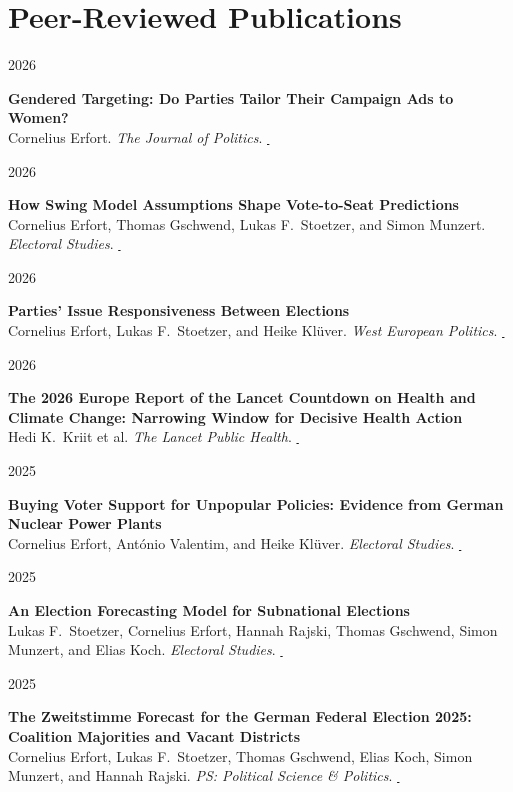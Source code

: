 \documentclass[11pt,a4paper]{article}
\newlength{\cvleftw}\setlength{\cvleftw}{0.20\textwidth}
\newlength{\cvrightw}\setlength{\cvrightw}{0.76\textwidth}
\newlength{\cvgap}\setlength{\cvgap}{0.02\textwidth}
\newenvironment{cventries}{\par\setlength{\parskip}{0pt}}{\par}
\newcommand{\cvitem}[2]{%
  \par\nopagebreak[2]%
  \noindent
  \begin{minipage}[t]{\cvleftw}\raggedright\color{cvmuted}\small\vspace{0pt}\strut #1\end{minipage}%
  \hspace{\cvgap}%
  \begin{minipage}[t]{\cvrightw}\raggedright\vspace{0pt}\strut #2\end{minipage}%
  \par\vspace{10pt plus 3pt minus 2pt}%
}
\newcommand{\cvtitle}[1]{\textbf{#1}}
\newcommand{\cvjournal}[1]{\textit{#1}}
\newcommand{\me}{Cornelius Erfort}
\begin{document}
\section*{Peer-Reviewed Publications}
\begin{cventries}
\cvitem{2026}{%
  \cvtitle{Gendered Targeting: Do Parties Tailor Their Campaign Ads to Women?} \\
  \me. \cvjournal{The Journal of Politics}.
  \href{https://doi.org/10.1086/736027}{\,\faExternalLink*}}
\cvitem{2026}{%
  \cvtitle{How Swing Model Assumptions Shape Vote-to-Seat Predictions} \\
  \me, Thomas Gschwend, Lukas F.\ Stoetzer, and Simon Munzert. \cvjournal{Electoral Studies}.
  \href{https://doi.org/10.1016/j.electstud.2026.103104}{\,\faExternalLink*}}
\cvitem{2026}{%
  \cvtitle{Parties' Issue Responsiveness Between Elections} \\
  \me, Lukas F.\ Stoetzer, and Heike Kl\"uver. \cvjournal{West European Politics}.
  \href{https://doi.org/10.1080/01402382.2026.2617088}{\,\faExternalLink*}}
\cvitem{2026}{%
  \cvtitle{The 2026 Europe Report of the Lancet Countdown on Health and Climate Change: Narrowing Window for Decisive Health Action} \\
  Hedi K.\ Kriit et al. \cvjournal{The Lancet Public Health}.
  \href{https://doi.org/10.1016/S2468-2667(26)00025-3}{\,\faExternalLink*}}
\cvitem{2025}{%
  \cvtitle{Buying Voter Support for Unpopular Policies: Evidence from German Nuclear Power Plants} \\
  \me, Ant\'onio Valentim, and Heike Kl\"uver. \cvjournal{Electoral Studies}.
  \href{https://www.sciencedirect.com/science/article/pii/S0261379425000654}{\,\faExternalLink*}}
\cvitem{2025}{%
  \cvtitle{An Election Forecasting Model for Subnational Elections} \\
  Lukas F.\ Stoetzer, \me, Hannah Rajski, Thomas Gschwend, Simon Munzert, and Elias Koch.
  \cvjournal{Electoral Studies}.
  \href{https://doi.org/10.1016/j.electstud.2025.102939}{\,\faExternalLink*}}
\cvitem{2025}{%
  \cvtitle{The Zweitstimme Forecast for the German Federal Election 2025: Coalition Majorities and Vacant Districts} \\
  \me, Lukas F.\ Stoetzer, Thomas Gschwend, Elias Koch, Simon Munzert, and Hannah Rajski.
  \cvjournal{PS: Political Science \& Politics}.
  \href{https://www.cambridge.org/core/journals/ps-political-science-and-politics/article/zweitstimme-forecast-for-the-german-federal-election-2025-coalition-majorities-and-vacant-districts/9DD258D89C69F73D1AFC284B0CDBE54D}{\,\faExternalLink*}}

\end{cventries}
\end{document}
